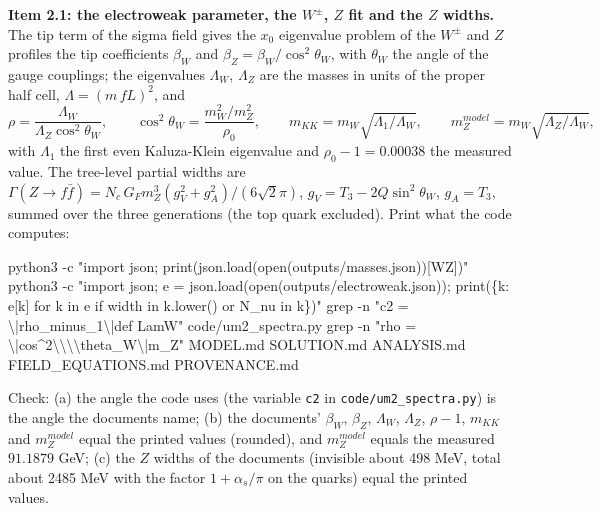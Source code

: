 \documentclass[
  10pt,
]{article}
\newenvironment{Shaded}{}{}
\newcommand{\NormalTok}[1]{#1}
\begin{document}
\textbf{Item 2.1: the electroweak parameter, the \(W^\pm\), \(Z\) fit
and the \(Z\) widths.} The tip term of the sigma field gives the \(x_0\)
eigenvalue problem of the \(W^\pm\) and \(Z\) profiles the tip
coefficients \(\beta_W\) and \(\beta_Z = \beta_W/\cos^2\theta_W\), with
\(\theta_W\) the angle of the gauge couplings; the eigenvalues
\(\Lambda_W\), \(\Lambda_Z\) are the masses in units of the proper half
cell, \(\Lambda = (m\,fL)^2\), and
\[ \rho = \frac{\Lambda_W}{\Lambda_Z\cos^2\theta_W},\qquad \cos^2\theta_W = \frac{m_W^2/m_Z^2}{\rho_0},\qquad m_{KK} = m_W\sqrt{\Lambda_1/\Lambda_W},\qquad m_Z^{model} = m_W\sqrt{\Lambda_Z/\Lambda_W}, \]
with \(\Lambda_1\) the first even Kaluza-Klein eigenvalue and
\(\rho_0 - 1 = 0.00038\) the measured value. The tree-level partial
widths are
\(\Gamma(Z\to f\bar f) = N_c\,G_Fm_Z^3(g_V^2 + g_A^2)/(6\sqrt2\pi)\),
\(g_V = T_3 - 2Q\sin^2\theta_W\), \(g_A = T_3\), summed over the three
generations (the top quark excluded). Print what the code computes:

\begin{Shaded}
\begin{Highlighting}[]
\NormalTok{python3 {-}c "import json; print(json.load(open(\textquotesingle{}outputs/masses.json\textquotesingle{}))[\textquotesingle{}WZ\textquotesingle{}])"}
\NormalTok{python3 {-}c "import json; e = json.load(open(\textquotesingle{}outputs/electroweak.json\textquotesingle{})); print(\{k: e[k] for k in e if \textquotesingle{}width\textquotesingle{} in k.lower() or \textquotesingle{}N\_nu\textquotesingle{} in k\})"}
\NormalTok{grep {-}n "c2 = \textbackslash{}|rho\_minus\_1\textbackslash{}|def LamW" code/um2\_spectra.py}
\NormalTok{grep {-}n "rho = \textbackslash{}|cos\^{}2\textbackslash{}\textbackslash{}\textbackslash{}\textbackslash{}theta\_W\textbackslash{}|m\_Z" MODEL.md SOLUTION.md ANALYSIS.md FIELD\_EQUATIONS.md PROVENANCE.md}
\end{Highlighting}
\end{Shaded}

Check: (a) the angle the code uses (the variable \texttt{c2} in
\texttt{code/um2\_spectra.py}) is the angle the documents name; (b) the
documents' \(\beta_W\), \(\beta_Z\), \(\Lambda_W\), \(\Lambda_Z\),
\(\rho - 1\), \(m_{KK}\) and \(m_Z^{model}\) equal the printed values
(rounded), and \(m_Z^{model}\) equals the measured \(91.1879\) GeV; (c)
the \(Z\) widths of the documents (invisible about 498 MeV, total about
2485 MeV with the factor \(1 + \alpha_s/\pi\) on the quarks) equal the
printed values.
\end{document}

